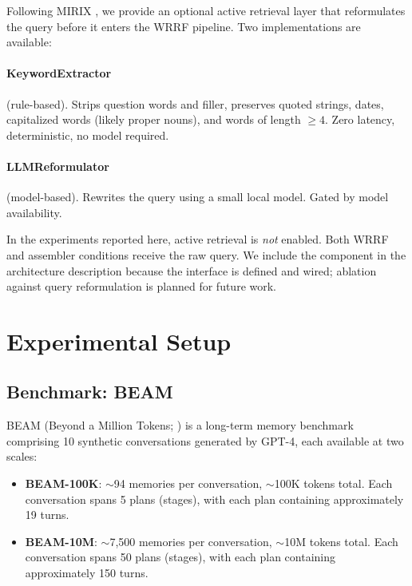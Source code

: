 \documentclass[11pt]{article}
\begin{document}
Following MIRIX \citep{Wang2025}, we provide an optional active
retrieval layer that reformulates the query before it enters the WRRF
pipeline.  Two implementations are available:

\paragraph{KeywordExtractor} (rule-based).
Strips question words and filler, preserves quoted strings, dates,
capitalized words (likely proper nouns), and words of length $\geq 4$.
Zero latency, deterministic, no model required.

\paragraph{LLMReformulator} (model-based).
Rewrites the query using a small local model.  Gated by model
availability.

In the experiments reported here, active retrieval is \emph{not}
enabled.  Both WRRF and assembler conditions receive the raw query.
We include the component in the architecture description because the
interface is defined and wired; ablation against query reformulation
is planned for future work.

\section{Experimental Setup}
\label{sec:experiments}

\subsection{Benchmark: BEAM}
\label{sec:beam}

BEAM (Beyond a Million Tokens; \citealt{Tavakoli2026}) is a long-term
memory benchmark comprising 10 synthetic conversations generated by
GPT-4, each available at two scales:

\begin{itemize}
  \item \textbf{BEAM-100K}: $\sim$94 memories per conversation,
    $\sim$100K tokens total.  Each conversation spans 5 plans
    (stages), with each plan containing approximately 19 turns.

  \item \textbf{BEAM-10M}: $\sim$7,500 memories per conversation,
    $\sim$10M tokens total.  Each conversation spans 50 plans
    (stages), with each plan containing approximately 150 turns.
\end{itemize}
\end{document}
